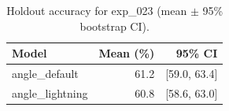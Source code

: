 \begin{table}[ht]
\centering
\caption{Holdout accuracy for exp_023 (mean $\pm$ 95\% bootstrap CI).}
\label{tab:exp_023}
\begin{tabular}{lrr}
\toprule
Model & Mean (\%) & 95\% CI \\
\midrule
angle\_default & 61.2 & [59.0, 63.4] \\
angle\_lightning & 60.8 & [58.6, 63.0] \\
\bottomrule
\end{tabular}
\end{table}
